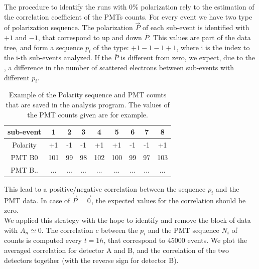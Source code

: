 The procedure to identify the runs with $0\%$ polarization rely to the estimation of the correlation coefficient of the PMTs counts. For every event we have two type of polarization sequence. The polarization $\vec{P}$ of each sub-event is identified with $+1$ and $-1$, that correspond to up and down $\overline{P}$. This values are part of the data tree, and form a sequence $p_{i}$ of the type: $+1-1-1+1$, where i is the index to the i-th sub-events analyzed. If the $\overline{P}$ is different from zero, we expect, due to the \transv, a difference in the number of scattered electrons between sub-events with different $p_{i}$.

\begin{table}[hbtp]
\centering
\begin{tabular}{c|c|c|c|c|c|c|c|c}
\hline 
sub-event & 1 & 2 & 3 & 4 & 5 & 6 & 7 & 8 \\ 
\hline 
Polarity & +1 & -1 & -1 & +1 & +1 & -1 & -1 & +1 \\ 
PMT B0 & 101 & 99 & 98 & 102 & 100 & 99 & 97 & 103 \\ 
PMT B.. & ... & ... & ... & ... & ... & ... & ... & ... \\ 
\hline
\end{tabular}
\caption{Example of the Polarity sequence and PMT counts that are saved in the analysis program. The values of the PMT counts given are for example. }
\end{table}

This lead to a positive/negative correlation between the sequence $p_{i}$ and the PMT data. In case of $\vec{P} = \vec{0}$, the expected values for the correlation should be zero. \\
We applied this strategy with the hope to identify and remove the block of data with $A_{n} \simeq 0$. The correlation $c$ between the $p_{i}$ and the PMT sequence $N_{i}$ of counts is computed every $t = 1 h$, that correspond to $45000$ events. We plot the averaged correlation for detector A and B, and the correlation of the two detectors together (with the reverse sign for detector B).

